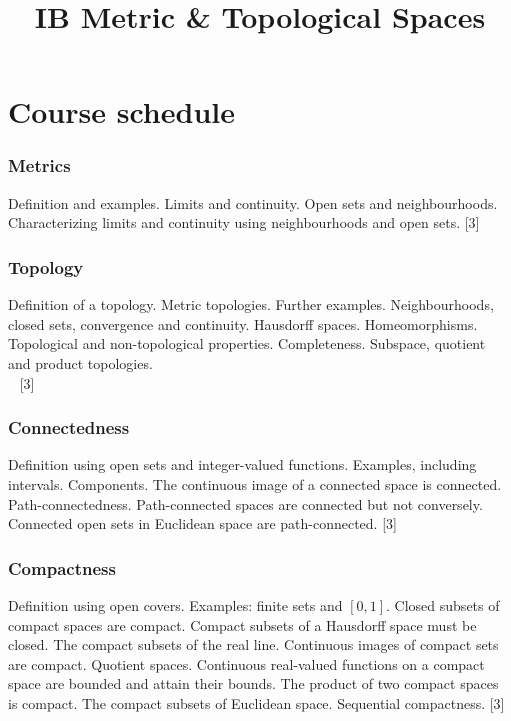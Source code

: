 \documentclass[twoside, numbers=noendperiod]{scrartcl}
\title{IB Metric \& Topological Spaces}
\begin{document}
{
\section*{Course schedule} %
\label{sub:course_schedule}

\subsubsection*{Metrics} %
\label{ssub:metrics}

Definition and examples. Limits and continuity. Open sets and neighbourhoods. Characterizing limits and continuity using neighbourhoods and open sets. \hfill [3]


\subsubsection*{Topology} %
\label{ssub:topology}

Definition of a topology. Metric topologies. Further examples. Neighbourhoods, closed sets, convergence and continuity. Hausdorff spaces. Homeomorphisms. Topological and non-topological properties. Completeness. Subspace, quotient and product topologies. \\
\mbox{  } \hfill [3]


\subsubsection*{Connectedness} %
\label{ssub:connectedness}

Definition using open sets and integer-valued functions. Examples, including intervals. Components. The continuous image of a connected space is connected. Path-connectedness. Path-connected spaces are connected but not conversely. Connected open sets in Euclidean space are path-connected. \hfill [3]


\subsubsection*{Compactness} %
\label{ssub:compactness}

Definition using open covers. Examples: finite sets and $[0,1]$. Closed subsets of compact spaces are compact. Compact subsets of a Hausdorff space must be closed. The compact subsets of the real line. Continuous images of compact sets are compact. Quotient spaces. Continuous real-valued functions on a compact space are bounded and attain their bounds. The product of two compact spaces is compact. The compact subsets of Euclidean space. Sequential compactness. \hfill [3]

}
\end{document}
